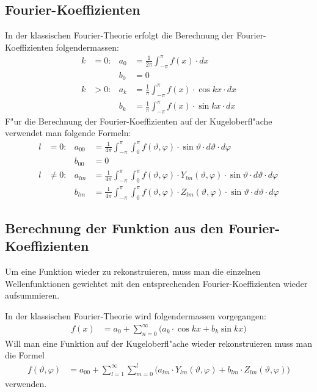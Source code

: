 \begin{refsection}
\subsection{Fourier-Koeffizienten}
In der klassischen Fourier-Theorie erfolgt die Berechnung der 
Fourier-Koeffizienten folgendermassen:
\begin{align*}
k&= 0: & a_{0} &= \frac{1}{2\pi} \int_{-\pi}^\pi f(x) \cdot dx
\\
&  & b_{0} &= 0
\\
k& > 0: & a_{k} &= \frac{1}{\pi} \int_{-\pi}^\pi f(x) \cdot \cos kx \cdot dx
\\
& & b_{k} &= \frac{1}{\pi} \int_{-\pi}^\pi f(x) \cdot \sin kx \cdot dx
\end{align*}
F"ur die Berechnung der Fourier-Koeffizienten auf der Kugeloberfl"ache 
verwendet man folgende Formeln:
\begin{align*}
l&=0: & a_{00} &= \frac{1}{4\pi} \int_{-\pi}^\pi \int_{0}^\pi f(\vartheta,\varphi) \cdot \sin\vartheta \cdot d\vartheta \cdot d\varphi
\\
&  & b_{00} &= 0
\\
l&\ne 0: & a_{lm} &= \frac{1}{4\pi} \int_{-\pi}^\pi \int_{0}^\pi f(\vartheta,\varphi) \cdot Y_{lm} (\vartheta, \varphi) \cdot \sin\vartheta \cdot d\vartheta \cdot d\varphi
\\
&  & b_{lm} &= \frac{1}{4\pi} \int_{-\pi}^\pi \int_{0}^\pi f(\vartheta,\varphi) \cdot Z_{lm} (\vartheta, \varphi) \cdot \sin\vartheta \cdot d\vartheta \cdot d\varphi
\end{align*}

\subsection{Berechnung der Funktion aus den Fourier-Koeffizienten}
Um eine Funktion wieder zu rekonstruieren, muss man die einzelnen 
Wellenfunktionen gewichtet mit den entsprechenden Fourier-Koeffizienten 
wieder aufsummieren.

In der klassischen Fourier-Theorie wird folgendermassen vorgegangen:
\begin{equation}
\begin{aligned}
f(x)&=a_0 + \sum_{n=0}^\infty \Big( a_k \cdot \cos kx + b_k \sin kx \Big)
\end{aligned}
\end{equation}
Will man eine Funktion auf der Kugeloberfl"ache wieder rekonstruieren 
muss man die Formel 
\begin{equation}
\begin{aligned}
f(\vartheta, \varphi) &= a_{00} + \sum_{l=1}^\infty \sum_{m=0}^l \Big( a_{lm} \cdot Y_{lm}(\vartheta, \varphi) + b_{lm} \cdot Z_{lm}(\vartheta, \varphi) \Big)
\end{aligned}
\end{equation}
verwenden.


\end{refsection}
